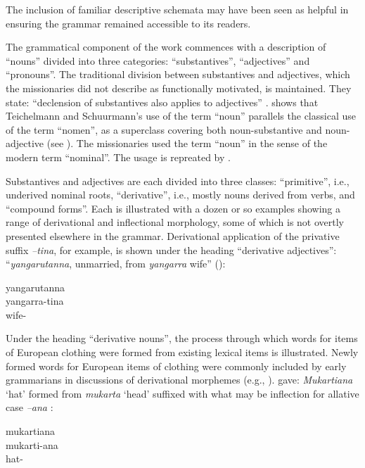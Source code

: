 The inclusion of familiar descriptive schemata may have been seen as helpful in ensuring the grammar remained accessible to its readers. 

The grammatical component of the work commences with a description of “nouns” divided into three categories: ``substantives'', “adjectives” and ``pronouns''. The traditional division between substantives and adjectives, which the missionaries did not describe as functionally motivated, is maintained. They state: “declension of substantives also applies to adjectives” \citep[4]{teichelmann_outlines_1840}. \citet{simpson2021} shows that Teichelmann and Schuurmann’s use of the term “noun” parallels the classical use of the term ``nomen'', as a superclass covering both noun-substantive and noun-adjective (see \citealt[33--37]{arnold1781}). The missionaries used the term “noun” in the sense of the modern term ``nominal''. The usage is repreated by \citet[2]{moorhouse_vocabulary_1846}.

Substantives and adjectives are each divided into three classes: ``primitive'', i.e., underived nominal roots, “derivative”, i.e., mostly nouns derived from verbs, and ``compound forms''. Each is illustrated with a dozen or so examples showing a range of derivational and inflectional morphology, some of which is not overtly presented elsewhere in the grammar. Derivational application of the privative suffix \textit{–tina}, for example, is shown under the heading ``derivative adjectives'': “\textit{yangarutanna}, unmarried, from \textit{yangarra} wife” (\citeyear[6]{teichelmann_outlines_1840}): 

\ea\label{ex:5:7}
  yangarutanna \\
\gll yangarra-tina \\
    wife-                            \\
\z

Under the heading “derivative nouns”, the process through which words for items of European clothing were formed from existing lexical items is illustrated. Newly formed words for European items of clothing were commonly included by early grammarians in discussions of derivational morphemes (e.g., \citealt[19]{meyer_vocabulary_1843}). \citet[4]{teichelmann_outlines_1840} gave: \textit{Mukartiana} `hat' formed from \textit{mukarta} `head' suffixed with what may be inflection for allative case \textit{–ana} \citep[122, 175]{amery_kulurdu_2013}: 

\ea\label{ex:5:8}
 mukartiana \\
\gll mukarti-ana\\
    hat-\\
\z

